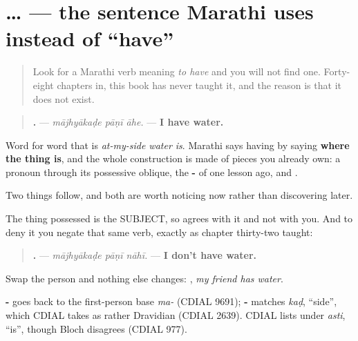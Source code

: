 \section[\texorpdfstring{\mr{माझ्याकडे} … \mr{आहे} (mājhyākaḍe … āhe)}{माझ्याकडे … आहे (mājhyākaḍe … āhe)}]{ …  — the sentence Marathi uses instead of \textquotedblleft{}have\textquotedblright{}}

\label{lesson:MR-C48-possession}



\begin{quote}
Look for a Marathi verb meaning \emph{to have} and you will not find one. Forty-eight chapters in, this book has never taught it, and the reason is that it does not exist.
\end{quote}

\begin{grammarlens}[title={Grammar Lens: possession is a place, not an action}]
\begin{quote}
\textbf{  .} — \emph{mājhyākaḍe pāṇī āhe.} — \textbf{I have water.}
\end{quote}

Word for word that is \emph{at-my-side water is}. Marathi says having by saying \textbf{where the thing is}, and the whole construction is made of pieces you already own: a pronoun through its possessive oblique, the \textbf{-} of one lesson ago, and \textbf{}.

Two things follow, and both are worth noticing now rather than discovering later.

The thing possessed is the SUBJECT, so \textbf{} agrees with it and not with you. And to deny it you negate that same verb, exactly as chapter thirty-two taught:

\begin{quote}
\textbf{  .} — \emph{mājhyākaḍe pāṇī nāhī.} — \textbf{I don't have water.}
\end{quote}

Swap the person and nothing else changes: \textbf{  }, \emph{my friend has water}.
\end{grammarlens}

\begin{cousinweb}
\textbf{-} goes back to the first-person base \emph{ma-} (CDIAL 9691); \textbf{-} matches \emph{kaḍ}, \textquotedblleft{}side\textquotedblright{}, which CDIAL takes as rather Dravidian (CDIAL 2639). \textbf{} CDIAL lists under \emph{asti}, \textquotedblleft{}is\textquotedblright{}, though Bloch disagrees (CDIAL 977).
\end{cousinweb}

